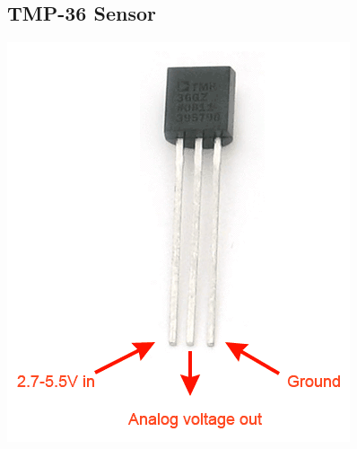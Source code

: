 \documentclass[a4paper,12pt,oneside,openright,titlepage]{book}
\begin{document}
\subsection{TMP-36 Sensor}
\begin{center}
\includegraphics[scale=0.8]{TMP-36}
\end{center}
\end{document}
